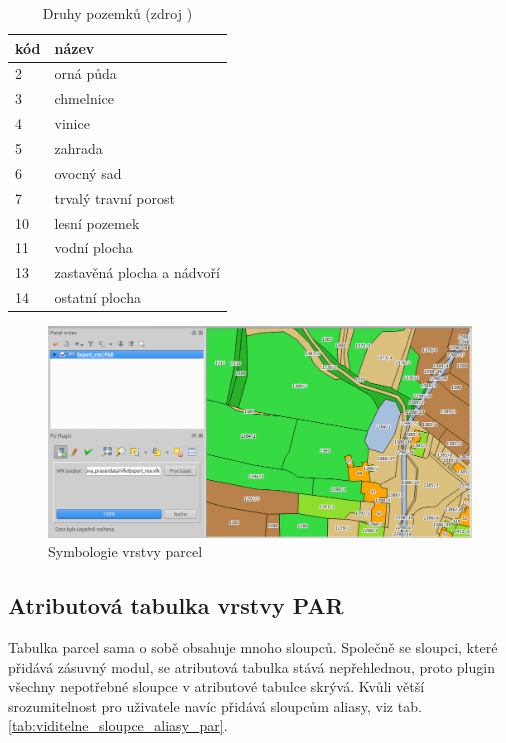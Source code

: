 \begin{table}[H]
    \begin{tabular}{|l|l|}
        \hline
         kód & název \\
        \hline
        \hline
          2 & orná půda \\ \hline
          3 & chmelnice \\ \hline          
          4 & vinice \\ \hline
          5 & zahrada \\ \hline
          6 & ovocný sad \\ \hline
          7 & trvalý travní porost \\ \hline
          10 & lesní pozemek \\ \hline
          11 & vodní plocha \\ \hline
          13 & zastavěná plocha a nádvoří \\ \hline
          14 & ostatní plocha \\
         \hline
    \end{tabular}
    \centering
    \caption[Druhy pozemků]{Druhy pozemků (zdroj \citep{vyhlaska_357})}
    \label{tab:druhy_pozemku}
\end{table}

	\begin{figure}[H]
		\centering
		\includegraphics[width=1.0\textwidth]{./pictures/symbologie_par.png}
		\caption[Symbologie vrstvy parcel]{Symbologie vrstvy parcel}
		\label{fig:symbologie_par}
 	\end{figure}

\subsection{Atributová tabulka vrstvy PAR}
\label{tabulka_par}

Tabulka parcel sama o sobě obsahuje mnoho sloupců. Společně se sloupci, které přidává zásuvný modul, se atributová tabulka stává nepřehlednou, proto plugin všechny nepotřebné sloupce v atributové tabulce skrývá. Kvůli větší srozumitelnost pro uživatele navíc přidává sloupcům aliasy, viz tab. \ref{tab:viditelne_sloupce_aliasy_par}.

